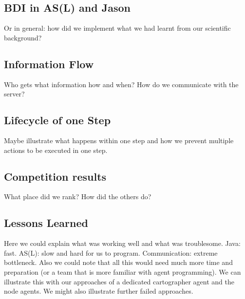 \subsection{BDI in AS(L) and Jason}
Or in general: how did we implement what we had learnt from our scientific background?
\subsection{Information Flow}
Who gets what information how and when? How do we communicate with the server?
\subsection{Lifecycle of one Step}
Maybe illustrate what happens within one step and how we prevent multiple actions to be executed in one step.
\subsection{Competition results}
What place did we rank? How did the others do?
\subsection{Lessons Learned}
Here we could explain what was working well and what was troublesome. Java: fast. AS(L): slow and hard for us to program. Communication: extreme bottleneck. Also we could note that all this would need much more time and preparation (or a team that is more familiar with agent programming).
We can illustrate this with our approaches of a dedicated cartographer agent and the node agents. We might also illustrate further failed approaches.
